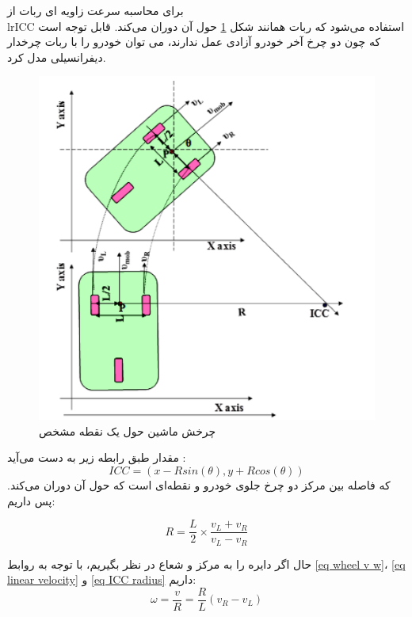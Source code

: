 برای محاسبه سرعت زاویه ای ربات از \\lr{ICC}  استفاده می‌شود که ربات همانند شکل \ref{Fig differential-robot-ICC} حول آن دوران می‌کند. قابل توجه است که چون دو چرخ آخر خودرو آزادی عمل ندارند، می توان خودرو را با ربات چرخدار دیفرانسیلی مدل کرد.
\begin{figure}[!h] 
	\centering
	\includegraphics[scale=0.28]{Images/differential-robot-ICC.png}
	\caption{چرخش ماشین حول یک نقطه مشخص} \label{Fig differential-robot-ICC}
\end{figure}

مقدار  طبق رابطه زیر به دست می‌آید \cite{salem2013dynamic}:
\begin{equation}
ICC = (x - Rsin(\theta), y + Rcos(\theta))
\end{equation}
 که  فاصله بین مرکز دو چرخ جلوی خودرو و نقطه‌ای است که حول آن دوران می‌کند. پس داریم:
 
\begin{equation} \label{eq ICC radius}
R = \frac{L}{2} \times \frac{v_L + v_R}{v_L - v_R}
\end{equation}

حال اگر دایره را به مرکز  و شعاع  در نظر بگیریم، با توجه به روابط \ref{eq wheel v w}، \ref{eq linear velocity} و \ref{eq ICC radius} داریم:
\begin{equation} \label{eq forward kinematics w}
\omega = \frac{v}{R} = \frac{R}{L}(v_R - v_L)
\end{equation}

